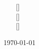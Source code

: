 \title{
	\Huge{\workSheet} \\
	\Large{\course}
}
\author{ %
	\textbf{\memberA} [\memberAMartricle]~\textit{\memberAMail} \\
	\textbf{\memberB} [\memberBMartricle]~\textit{\memberBMail} \\
	\textbf{\memberC} [\memberCMartricle]~\textit{\memberCMail} \\
}
\date{\today}

\pagestyle{fancy}
\fancyhf{}

\lhead{
	\semester \\
	\courseShort \\
	\workSheet
}
\chead{\group}
\cfoot{\thepage}


\usepackage[
	pdftitle={\semester~\course~\workSheet},
pdfauthor={\memberA, \memberB, \memberC, \memberD, \memberE, \memberF,},
	pdfsubject={\course},
	pdfkeywords={\semester, \courseShort, \course, \group, \workSheet},
	unicode
]{hyperref}